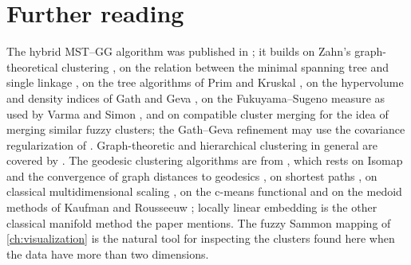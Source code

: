 
\section{Further reading}\label{sec:graph:reading}
\enlargethispage{3\baselineskip}%

The hybrid MST--GG algorithm was published in \cite{vathy:2005:mst}; it builds on Zahn's graph-theoretical clustering \cite{zahn:1971}, on the relation between the minimal spanning tree and single linkage \cite{gower:1969:mst}, on the tree algorithms of Prim and Kruskal \cite{prim:1957,kruskal:1956}, on the hypervolume and density indices of Gath and Geva \cite{gath:1989}, on the Fukuyama--Sugeno measure \cite{fukuyama:1989:validity} as used by Varma and Simon \cite{varma:2004:mst}, and on compatible cluster merging \cite{kaymak:1995:merging} for the idea of merging similar fuzzy clusters; the Gath--Geva refinement may use the covariance regularization of \cite{babuska:2002:covariance}. Graph-theoretic and hierarchical clustering in general are covered by \cite{jain:1988:book}. The geodesic clustering algorithms are from \cite{feil:2007:geodesic}, which rests on Isomap \cite{tenenbaum:2000:isomap} and the convergence of graph distances to geodesics \cite{bernstein:2000:geodesic}, on shortest paths \cite{dijkstra:1959,floyd:1962}, on classical multidimensional scaling \cite{torgerson:1952:mds}, on the c-means functional \cite{bezdek:1981} and on the medoid methods of Kaufman and Rousseeuw \cite{kaufman:1990:groups}; locally linear embedding \cite{roweis:2000:lle} is the other classical manifold method the paper mentions. The fuzzy Sammon mapping of \cref{ch:visualization} \cite{feil:2007:fuzzsam} is the natural tool for inspecting the clusters found here when the data have more than two dimensions.
